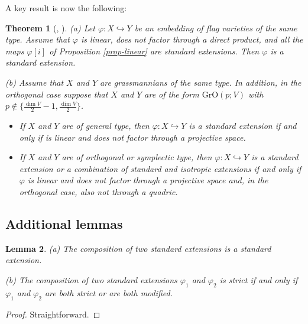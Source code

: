 \documentclass[12pt]{amsart}
\newcommand{\OGrass}{\mathrm{GrO}}
\newtheorem{theorem}{Theorem}[section]
\newtheorem{lemma}[theorem]{Lemma}
\theoremstyle{definition}
\begin{document}
A key result is now the following:

\begin{theorem}[{\cite[Theorem 1]{PT1}}, {\cite[Theorem 4.2]{PT}}]
\label{T-PT}
{\rm (a)} Let $\varphi:X\hookrightarrow Y$ be an embedding of flag varieties of the same type. Assume that $\varphi$ is linear, does not factor through a direct product, and all the maps $\varphi[i]$ of Proposition \ref{prop-linear} are standard extensions. Then $\varphi$ is a standard extension. 

{\rm (b)} Assume that $X$ and $Y$ are grassmannians of the same type. In addition,
in the orthogonal case suppose that $X$ and $Y$ are of the form $\OGrass(p;V)$ with $p\notin\{\frac{\dim V}{2}-1,\frac{\dim V}{2}\}$.  
\begin{itemize}
\item[\rm (i)] If $X$ and $Y$ are of general type, then $\varphi:X\hookrightarrow Y$ is a standard extension if and only if is linear and does not factor through a projective space.
\item[\rm (ii)] If $X$ and $Y$ are of orthogonal or symplectic type, then $\varphi:X\hookrightarrow Y$ is a standard extension or a combination of standard and isotropic extensions if and only if $\varphi$ is linear and does not factor through a projective space and, in the orthogonal case, also not through a quadric.
\end{itemize}
\end{theorem}


\subsection{Additional lemmas}

\begin{lemma}
\label{L-se}
{\rm (a)} The composition of two standard extensions is a standard extension.

{\rm (b)} The composition of two standard extensions $\varphi_1$ and $\varphi_2$ is strict if and only if $\varphi_1$ and $\varphi_2$ are both strict or are both modified.
\end{lemma}

\begin{proof}
Straightforward.
\end{proof}
\end{document}
